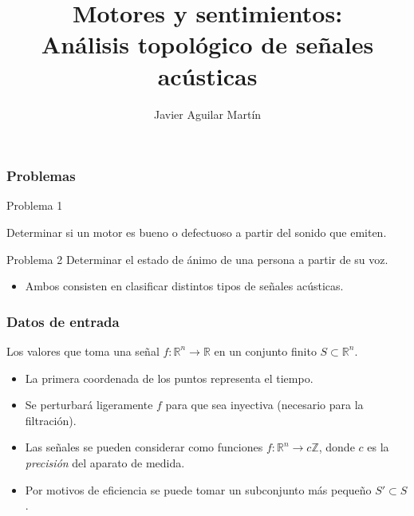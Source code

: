 \documentclass{beamer}
\title{Motores y sentimientos:\\ Análisis topológico de señales acústicas}
\author{Javier Aguilar Martín}
\institute{Universidad de Sevilla}
\newcommand{\R}{\mathbb{R}}
\newcommand{\Z}{\mathbb{Z}}
\begin{document}
\frame{\titlepage}

\begin{frame}
\frametitle{Problemas}




\begin{block}{Problema 1}


Determinar si un motor es bueno o defectuoso a partir del sonido que emiten.
\end{block}\pause

\begin{block}{Problema 2}
Determinar el estado de ánimo de una persona a partir de su voz.
\end{block}\pause
\vspace{0.5cm}

\begin{itemize}
\item Ambos consisten en clasificar distintos tipos de señales acústicas.
\end{itemize}

\end{frame}

\begin{frame}
\frametitle{Datos de entrada}
Los valores que toma una señal $f:\R^n\to\R$ en un conjunto finito $S\subset \R^n$.

\begin{itemize}
\item<2-> La primera coordenada de los puntos representa el tiempo.
\item<3-> Se perturbará ligeramente $f$ para que sea inyectiva (necesario para la filtración).
\item<4-> Las señales se pueden considerar como funciones $f:\R^n\to c\Z$, donde $c$ es la \emph{precisión} del aparato de medida.
\item<5-> Por motivos de eficiencia se puede tomar un subconjunto más pequeño $S'\subset S$.
\end{itemize}


\end{frame}
\end{document}

